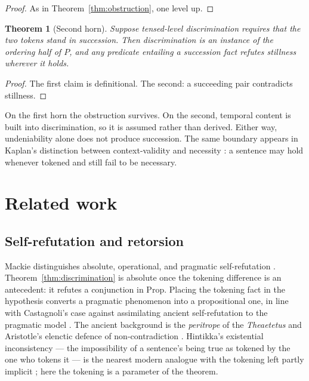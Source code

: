 \documentclass[11pt]{article}
\newtheorem{theorem}{Theorem}[section]
\begin{document}
\begin{proof}
As in Theorem~\ref{thm:obstruction}, one level up.
\end{proof}

\begin{theorem}[Second horn]
\label{thm:horntwo}
Suppose tensed-level discrimination requires that the two tokens stand in
succession. Then discrimination is an instance of the ordering half of \(P\),
and any predicate entailing a succession fact refutes stillness wherever it
holds.
\end{theorem}

\begin{proof}
The first claim is definitional. The second: a succeeding pair contradicts
stillness.
\end{proof}

On the first horn the obstruction survives. On the second, temporal content is
built into discrimination, so it is assumed rather than derived. Either way,
undeniability alone does not produce succession. The same boundary appears in
Kaplan's distinction between context-validity and necessity \cite{kaplan1989}:
a sentence may hold whenever tokened and still fail to be necessary.

\section{Related work}
\label{sec:related}

\subsection{Self-refutation and retorsion}

Mackie distinguishes absolute, operational, and pragmatic self-refutation
\cite{mackie1964}. Theorem~\ref{thm:discrimination} is absolute once the
tokening difference is an antecedent: it refutes a conjunction in
\(\mathrm{Prop}\). Placing the tokening fact in the hypothesis converts a
pragmatic phenomenon into a propositional one, in line with Castagnoli's case
against assimilating ancient self-refutation to the pragmatic model
\cite{castagnoli2010}. The ancient background is the \emph{peritrope} of the
\emph{Theaetetus} and Aristotle's elenctic defence of non-contradiction
\cite{plato,aristotle,burnyeat1976}. Hintikka's existential inconsistency ---
the impossibility of a sentence's being true as tokened by the one who tokens
it --- is the nearest modern analogue with the tokening left partly implicit
\cite{hintikka1962}; here the tokening is a parameter of the theorem.
\end{document}
